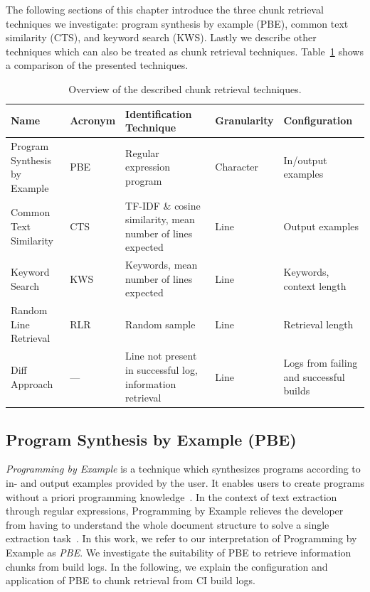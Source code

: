 \documentclass[\myrootdir/main.tex]{subfiles}
\begin{document}
The following sections of this chapter introduce the three chunk retrieval techniques we investigate: program synthesis by example (PBE), common text similarity (CTS), and keyword search (KWS).
Lastly we describe other techniques which can also be treated as chunk retrieval techniques.
Table~\ref{tab:ctr} shows a comparison of the presented techniques.

\begin{table}[htbp]
\centering
\caption{Overview of the described chunk retrieval techniques.}
\begin{tabularx}{\textwidth}{@{}XlXlX@{}} 
\toprule
Name                         & Acronym & Identification Technique                                   & Granularity & Configuration             \\ 
\midrule
Program Synthesis by Example & PBE     & Regular expression program                                 & Character   & In/output examples      \\
Common Text Similarity       & CTS     & TF-IDF \& cosine similarity, mean number of lines expected & Line        & Output examples           \\
Keyword Search               & KWS     & Keywords, mean number of lines expected                    & Line        & Keywords, context length  \\
Random Line Retrieval        & RLR     & Random sample                                              & Line        & Retrieval length          \\
Diff Approach                & ---        & Line not present in successful log, information retrieval  & Line        & Logs from failing and successful builds      \\
\bottomrule
\end{tabularx}
\label{tab:ctr}
\end{table}

\subsection{Program Synthesis by Example (PBE)}
\label{sec:expl-pbe}
\emph{Programming by Example} is a technique which synthesizes programs according to in- and output examples provided by the user.
It enables users to create programs without a priori programming knowledge~\cite{mayer2015user}.
In the context of text extraction through regular expressions, Programming by Example relieves the developer from having to understand the whole document structure to solve a single extraction task~\cite{le2014flashextract:}.
In this work, we refer to our interpretation of Programming by Example as \emph{PBE}\@.
We investigate the suitability of PBE to retrieve information chunks from build logs.
In the following, we explain the configuration and application of PBE to chunk retrieval from CI build logs.
\end{document}
